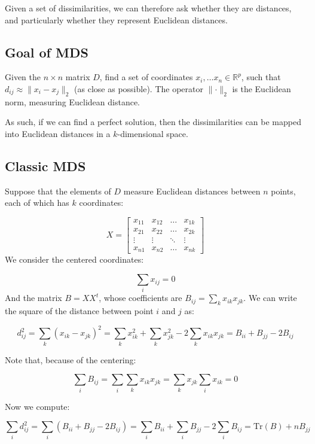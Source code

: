 \documentclass[
  letterpaper,
  DIV=11,
  numbers=noendperiod]{scrreprt}
\begin{document}
Given a set of dissimilarities, we can therefore ask whether they are
distances, and particularly whether they represent Euclidean distances.

\subsection{Goal of MDS}\label{goal-of-mds}

Given the \(n \times n\) matrix \(D\), find a set of coordinates
\(x_i, \ldots x_n \in \mathbb R^p\), such that
\(d_{ij} \approx \lVert x_i - x_j \rVert_2\) (as close as possible). The
operator \(\lVert \cdot \rVert_2\) is the Euclidean norm, measuring
Euclidean distance.

As such, if we can find a perfect solution, then the dissimilarities can
be mapped into Euclidean distances in a \(k\)-dimensional space.

\subsection{Classic MDS}\label{classic-mds}

Suppose that the elements of \(D\) measure Euclidean distances between
\(n\) points, each of which has \(k\) coordinates:

\[
X = \begin{bmatrix}
    x_{11} & x_{12} &  \dots  & x_{1k} \\
    x_{21} & x_{22} &  \dots  & x_{2k} \\
    \vdots & \vdots &  \ddots & \vdots \\
    x_{n1} & x_{n2} &  \dots  & x_{nk}
\end{bmatrix}
\] We consider the centered coordinates:

\[
\sum_i x_{ij} = 0
\] And the matrix \(B = X X^t\), whose coefficients are
\(B_{ij} = \sum_k x_{ik} x_{jk}\). We can write the square of the
distance between point \(i\) and \(j\) as:

\[ d_{ij}^2 = \sum_k (x_{ik} - x_{jk})^2  = \sum_k x_{ik}^2 + \sum_k x_{jk}^2 -2 \sum_k x_{ik} x_{jk} = B_{ii} + B_{jj} - 2 B_{ij}\]

Note that, because of the centering:

\[
\sum_i B_{ij} = \sum_i \sum_k x_{ik} x_{jk} = \sum_k x_{jk} \sum_i x_{ik} = 0
\]

Now we compute:

\[
\sum_i d_{ij}^2 = \sum_i (B_{ii} + B_{jj} - 2 B_{ij}) = \sum_i B_{ii} + \sum_i B_{jj} - 2 \sum_i B_{ij} = \text{Tr}(B) + n B_{jj} 
\]
\end{document}
